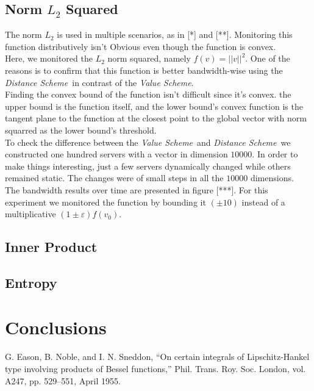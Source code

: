 \documentclass[10pt, conference]{IEEEtran}
\newcommand{\valueScheme}{\textit{Value Scheme}}
\newcommand{\distanceScheme}{\textit{Distance Scheme}}
\begin{document}
\subsection{Norm $L_2$ Squared}
The norm $L_2$ is used in multiple scenarios, as in [*] and [**]. Monitoring this function distributively isn't Obvious even though the function is convex. \\
Here, we monitored the $L_2$ norm squared, namely $f(v) = ||v||^2$. One of the reasons is to confirm that this function is better bandwidth-wise using the \distanceScheme \ in contrast of the \valueScheme . \\
Finding the convex bound of the function isn't difficult since it's convex. the upper bound is the function itself, and the lower bound's convex function is the tangent plane to the function at the closest point to the global vector with norm squarred as the lower bound's threshold. \\
To check the difference between the \valueScheme \ and \distanceScheme \ we constructed one hundred servers with a vector in dimension $\num[group-separator={,}]{10000}$. In order to make things interesting, just a few servers dynamically changed while others remained static. The changes were of small steps in all the $\num[group-separator={,}]{10000}$ dimensions. \\
The bandwidth results over time are presented in figure [***]. For this experiment we monitored the function by bounding it ${(\pm 10)}$ instead of a multiplicative ${(1 \pm \varepsilon)f(v_0)}$.
 
\subsection{Inner Product}
\subsection{Entropy}

\section{Conclusions}

\begin{thebibliography}{00}
 G. Eason, B. Noble, and I. N. Sneddon, ``On certain integrals of Lipschitz-Hankel type involving products of Bessel functions,'' Phil. Trans. Roy. Soc. London, vol. A247, pp. 529--551, April 1955.
\end{thebibliography}

\end{document}
